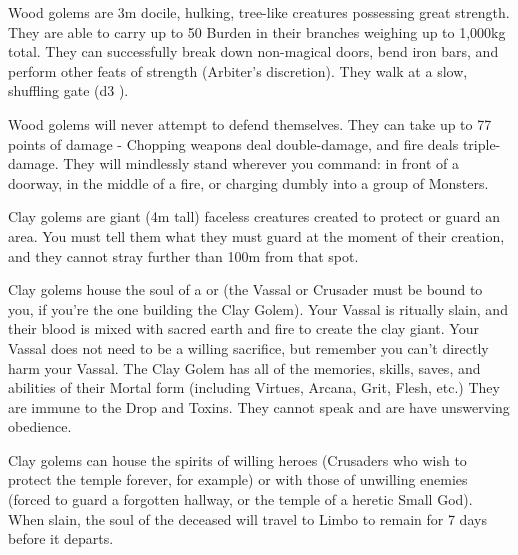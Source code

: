 
Wood golems are 3m docile, hulking, tree-like creatures possessing great strength. They are able to carry up to 50 Burden in their branches weighing up to 1,000kg total.  They can successfully break down non-magical doors, bend iron bars, and perform other feats of strength (Arbiter's discretion).  They walk at a slow, shuffling gate (d3 \MD).

Wood golems will never attempt to defend themselves.  They can take up to 77 points of damage - Chopping weapons deal double-damage, and fire deals triple-damage.  They will mindlessly stand wherever you command: in front of a doorway, in the middle of a fire, or charging dumbly into a group of Monsters.


Clay golems are giant (4m tall) faceless creatures created to protect or guard an area.  You must tell them what they must guard at the moment of their creation, and they cannot stray further than 100m from that spot.  

Clay golems house the soul of a  or  (the Vassal or Crusader must be bound to you, if you're the one building the Clay Golem). Your Vassal is ritually slain, and their blood is mixed with sacred earth and fire to create the clay giant. Your Vassal does not need to be a willing sacrifice, but remember you can't directly harm your Vassal.  The Clay Golem has all of the memories, skills, saves, and abilities of their Mortal form (including Virtues, Arcana, Grit, Flesh, etc.)  They are immune to the Drop and Toxins. They cannot speak and are have unswerving obedience.

Clay golems can house the spirits of willing heroes (Crusaders who wish to protect the temple forever, for example) or with those of unwilling enemies (forced to guard a forgotten hallway, or the temple of a heretic Small God).  When slain, the soul of the deceased will travel to Limbo to remain for 7 days before it departs.

\newpage

